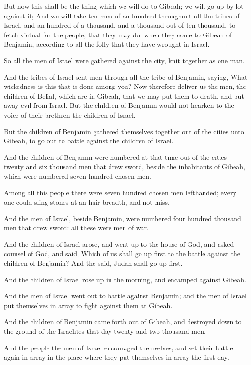 \Verse But now this shall be the thing which we will do to Gibeah; we will go up by lot against it; \Verse And we will take ten men of an hundred throughout all the tribes of Israel, and an hundred of a thousand, and a thousand out of ten thousand, to fetch victual for the people, that they may do, when they come to Gibeah of Benjamin, according to all the folly that they have wrought in Israel.

\Verse So all the men of Israel were gathered against the city, knit together as one man.

\Verse And the tribes of Israel sent men through all the tribe of Benjamin, saying, What wickedness is this that is done among you?  \Verse Now therefore deliver us the men, the children of Belial, which are in Gibeah, that we may put them to death, and put away evil from Israel. But the children of Benjamin would not hearken to the voice of their brethren the children of Israel.

\Verse But the children of Benjamin gathered themselves together out of the cities unto Gibeah, to go out to battle against the children of Israel.

\Verse And the children of Benjamin were numbered at that time out of the cities twenty and six thousand men that drew sword, beside the inhabitants of Gibeah, which were numbered seven hundred chosen men.

\Verse Among all this people there were seven hundred chosen men lefthanded; every one could sling stones at an hair breadth, and not miss.

\Verse And the men of Israel, beside Benjamin, were numbered four hundred thousand men that drew sword: all these were men of war.

\Verse And the children of Israel arose, and went up to the house of God, and asked counsel of God, and said, Which of us shall go up first to the battle against the children of Benjamin? And the \LORD said, Judah shall go up first.

\Verse And the children of Israel rose up in the morning, and encamped against Gibeah.

\Verse And the men of Israel went out to battle against Benjamin; and the men of Israel put themselves in array to fight against them at Gibeah.

\Verse And the children of Benjamin came forth out of Gibeah, and destroyed down to the ground of the Israelites that day twenty and two thousand men.

\Verse And the people the men of Israel encouraged themselves, and set their battle again in array in the place where they put themselves in array the first day.

